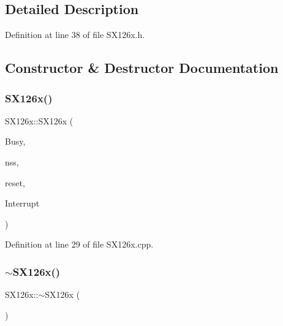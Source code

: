 \subsection{Detailed Description}


Definition at line 38 of file S\+X126x.\+h.



\subsection{Constructor \& Destructor Documentation}
\mbox{\label{class_s_x126x_a325ba815822bd31fcae9d4effcc1aea5}} 
\subsubsection{\texorpdfstring{S\+X126x()}{SX126x()}}
{\footnotesize\ttfamily S\+X126x\+::\+S\+X126x (\begin{DoxyParamCaption}\item[{\mbox{\hyperlink{_class_s_t_m32_l0_8h_a5ceb873075d76667eb54dc6a7d2734d1}{Pin\+Name}}}]{Busy,  }\item[{\mbox{\hyperlink{_class_s_t_m32_l0_8h_a5ceb873075d76667eb54dc6a7d2734d1}{Pin\+Name}}}]{nss,  }\item[{\mbox{\hyperlink{_class_s_t_m32_l0_8h_a5ceb873075d76667eb54dc6a7d2734d1}{Pin\+Name}}}]{reset,  }\item[{\mbox{\hyperlink{_class_s_t_m32_l0_8h_a5ceb873075d76667eb54dc6a7d2734d1}{Pin\+Name}}}]{Interrupt }\end{DoxyParamCaption})}



Definition at line 29 of file S\+X126x.\+cpp.

\mbox{\label{class_s_x126x_ade46beffc61c639d93c2cad02b92c902}} 
\subsubsection{\texorpdfstring{$\sim$\+S\+X126x()}{~SX126x()}}
{\footnotesize\ttfamily S\+X126x\+::$\sim$\+S\+X126x (\begin{DoxyParamCaption}{ }\end{DoxyParamCaption})\hspace{0.3cm}{\ttfamily [inline]}}



